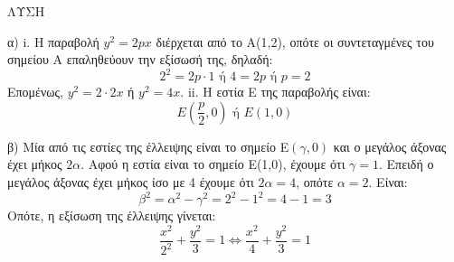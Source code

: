 ΛΥΣΗ

α)
i. Η παραβολή $y^2 = 2px$ διέρχεται από το A(1,2), οπότε οι συντεταγμένες του σημείου Α επαληθεύουν την εξίσωσή της, δηλαδή:
\[ 2^2 = 2p \cdot 1 \text{ ή } 4 = 2p \text{ ή } p = 2 \]
Επομένως, $y^2 = 2 \cdot 2x$ ή $y^2 = 4x$.
ii. Η εστία E της παραβολής είναι:
\[ E\left(\frac{p}{2},0\right) \text{ ή } E(1,0) \]

β) Μία από τις εστίες της έλλειψης είναι το σημείο E$(\gamma,0)$ και ο μεγάλος άξονας έχει μήκος $2\alpha$.
Αφού η εστία είναι το σημείο E(1,0), έχουμε ότι $\gamma = 1$.
Επειδή ο μεγάλος άξονας έχει μήκος ίσο με 4 έχουμε ότι $2\alpha = 4$, οπότε $\alpha = 2$.
Είναι:
\[ \beta^2 = \alpha^2 - \gamma^2 = 2^2 - 1^2 = 4 - 1 = 3 \]
Οπότε, η εξίσωση της έλλειψης γίνεται:
\[ \frac{x^2}{2^2} + \frac{y^2}{3} = 1 \iff \frac{x^2}{4} + \frac{y^2}{3} = 1 \]